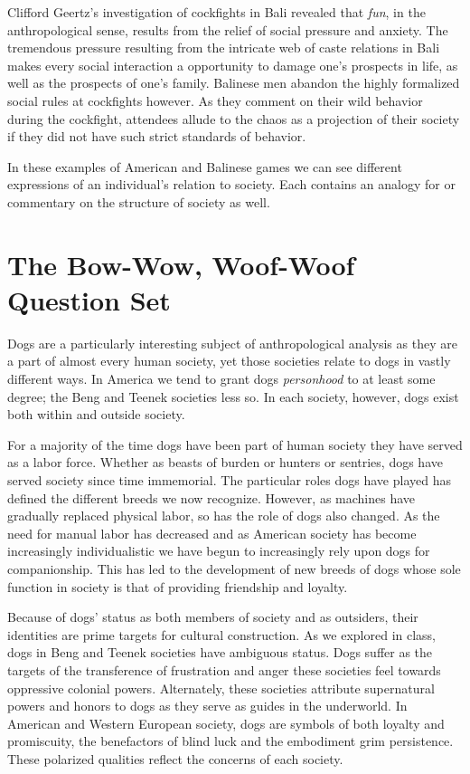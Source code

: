 \documentclass[12pt]{article}
\begin{document}
\begin{flushleft}
Clifford Geertz's investigation of cockfights in Bali revealed that \emph{fun}, in the
anthropological sense, results from the relief of social pressure and anxiety.
The tremendous pressure resulting from the intricate web of caste relations in
Bali makes every social interaction a opportunity to damage one's prospects in
life, as well as the prospects of one's family. Balinese men abandon the highly
formalized social rules at cockfights however. As they comment on their wild
behavior during the cockfight, attendees allude to the chaos as a projection of
their society if they did not have such strict standards of behavior.

In these examples of American and Balinese games we can see different
expressions of an individual's relation to society. Each contains an analogy for
or commentary on the structure of society as well.

\section{The Bow-Wow, Woof-Woof Question Set}

Dogs are a particularly interesting subject of anthropological analysis as they
are a part of almost every human society, yet those societies relate to dogs in
vastly different ways. In America we tend to grant dogs \emph{personhood} to at least
some degree; the Beng and Teenek societies less so. In each society, however,
dogs exist both within and outside society.

For a majority of the time dogs have been part of human society they have served
as a labor force. Whether as beasts of burden or hunters or sentries, dogs have
served society since time immemorial. The particular roles dogs have played has
defined the different breeds we now recognize. However, as machines have
gradually replaced physical labor, so has the role of dogs also changed. As the
need for manual labor has decreased and as American society has become
increasingly individualistic we have begun to increasingly rely upon dogs for
companionship. This has led to the development of new breeds of dogs whose sole
function in society is that of providing friendship and loyalty.

Because of dogs' status as both members of society and as outsiders, their
identities are prime targets for cultural construction. As we explored in class,
dogs in Beng and Teenek societies have ambiguous status. Dogs suffer as the
targets of the transference of frustration and anger these societies feel
towards oppressive colonial powers. Alternately, these societies attribute
supernatural powers and honors to dogs as they serve as guides in the
underworld. In American and Western European society, dogs are symbols of both
loyalty and promiscuity, the benefactors of blind luck and the embodiment grim
persistence. These polarized qualities reflect the concerns of each society.

\setlength{\parindent}{0.5in}


\end{flushleft}
\end{document}
